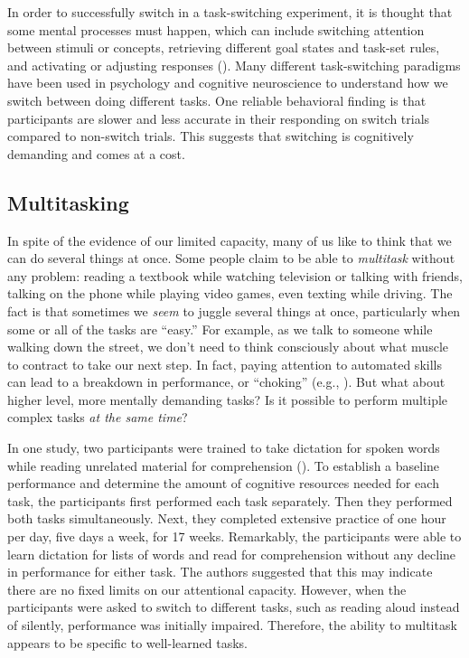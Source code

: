 \documentclass[
]{krantz}
\begin{document}
In order to successfully switch in a task-switching experiment, it is thought that some mental processes must happen, which can include switching attention between stimuli or concepts, retrieving different goal states and task-set rules, and activating or adjusting responses (). Many different task-switching paradigms have been used in psychology and cognitive neuroscience to understand how we switch between doing different tasks. One reliable behavioral finding is that participants are slower and less accurate in their responding on switch trials compared to non-switch trials. This suggests that switching is cognitively demanding and comes at a cost.

\subsection*{Multitasking}\label{multitasking}


In spite of the evidence of our limited capacity, many of us like to think that we can do several things at once. Some people claim to be able to \emph{multitask} without any problem: reading a textbook while watching television or talking with friends, talking on the phone while playing video games, even texting while driving. The fact is that sometimes we \emph{seem} to juggle several things at once, particularly when some or all of the tasks are ``easy.'' For example, as we talk to someone while walking down the street, we don't need to think consciously about what muscle to contract to take our next step. In fact, paying attention to automated skills can lead to a breakdown in performance, or ``choking'' (e.g., ). But what about higher level, more mentally demanding tasks? Is it possible to perform multiple complex tasks \emph{at the same time}?

In one study, two participants were trained to take dictation for spoken words while reading unrelated material for comprehension (). To establish a baseline performance and determine the amount of cognitive resources needed for each task, the participants first performed each task separately. Then they performed both tasks simultaneously. Next, they completed extensive practice of one hour per day, five days a week, for 17 weeks. Remarkably, the participants were able to learn dictation for lists of words and read for comprehension without any decline in performance for either task. The authors suggested that this may indicate there are no fixed limits on our attentional capacity. However, when the participants were asked to switch to different tasks, such as reading aloud instead of silently, performance was initially impaired. Therefore, the ability to multitask appears to be specific to well-learned tasks.
\end{document}
